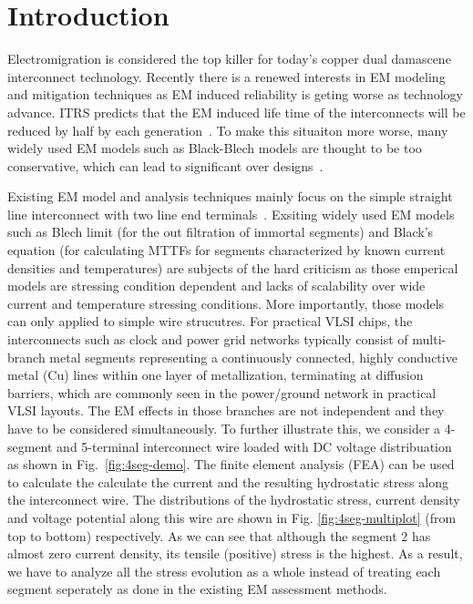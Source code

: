\section{Introduction}
\label{sec:intro}

Electromigration is considered the top killer for today's copper dual
damascene interconnect technology. Recently there is a renewed
interests in EM modeling and mitigation techniques as EM induced
reliability is geting worse as technology advance.  ITRS predicts that
the EM induced life time of the interconnects will be reduced by half
by each generation~\cite{ITRS}. To make this situaiton more worse,
many widely used EM models such as Black-Blech models are thought to
be too conservative, which can lead to significant over
designs~\cite{Bailey:semieng}.

Existing EM model and analysis techniques mainly focus on the simple
straight line interconnect with two line end
terminals~\cite{deOrio:2010}.  Exsiting widely used EM models such as
Blech limit \cite{Blech:1976ko} (for the out filtration of immortal
segments) and Black's equation \cite{Black:1969fc} (for calculating
MTTFs for segments characterized by known current densities and
temperatures) are subjects of the hard criticism
\cite{Ohring:1998uj}\cite{Lloyd:2008je}\cite{Hauschildt:2013cv} as
those emperical models are stressing condition dependent and lacks of
scalability over wide current and temperature stressing
conditions. More importantly, those models can only applied to simple
wire strucutres.  For practical VLSI chips, the interconnects such as
clock and power grid networks typically consist of multi-branch metal
segments representing a continuously connected, highly conductive
metal (Cu) lines within one layer of metallization, terminating at
diffusion barriers, which are commonly seen in the power/ground
network in practical VLSI layouts.  The EM effects in those branches
are not independent and they have to be considered simultaneously.  To
further illustrate this, we consider a 4-segment and 5-terminal
interconnect wire loaded with DC voltage distribuation as shown in
Fig.~\ref{fig:4seg-demo}. The finite element analysis (FEA) can be
used to calculate the calculate the current and the resulting
hydrostatic stress along the interconnect wire.  The distributions
of the hydrostatic stress, current density and voltage potential along
this wire are shown in Fig. \ref{fig:4seg-multiplot} (from top to
bottom) respectively. As we can see that although the segment 2 has
almost zero current density, its tensile (positive) stress is the
highest. As a result, we have to analyze all the stress evolution as a
whole instead of treating each segment seperately as done in the
existing EM assessment methods.

